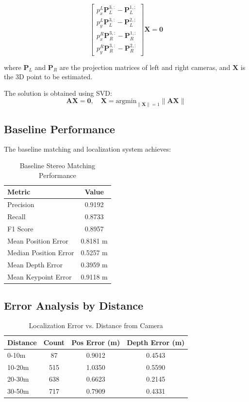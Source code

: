 \documentclass[11pt,a4paper]{article}
\begin{document}
\begin{equation}
\begin{bmatrix}
p_x^L \mathbf{P}_L^{3,:} - \mathbf{P}_L^{1,:} \\
p_y^L \mathbf{P}_L^{3,:} - \mathbf{P}_L^{2,:} \\
p_x^R \mathbf{P}_R^{3,:} - \mathbf{P}_R^{1,:} \\
p_y^R \mathbf{P}_R^{3,:} - \mathbf{P}_R^{2,:}
\end{bmatrix}
\mathbf{X} = \mathbf{0}
\end{equation}

where $\mathbf{P}_L$ and $\mathbf{P}_R$ are the projection matrices of left and right cameras, and $\mathbf{X}$ is the 3D point to be estimated.

The solution is obtained using SVD:
\begin{equation}
\mathbf{A}\mathbf{X} = \mathbf{0}, \quad \mathbf{X} = \text{argmin}_{\|\mathbf{X}\|=1} \|\mathbf{A}\mathbf{X}\|
\end{equation}

\subsection{Baseline Performance}

The baseline matching and localization system achieves:

\begin{table}[h]
\centering
\caption{Baseline Stereo Matching Performance}
\begin{tabular}{lc}
\toprule
\textbf{Metric} & \textbf{Value} \\
\midrule
Precision & 0.9192 \\
Recall & 0.8733 \\
F1 Score & 0.8957 \\
Mean Position Error & 0.8181 m \\
Median Position Error & 0.5257 m \\
Mean Depth Error & 0.3959 m \\
Mean Keypoint Error & 0.9118 m \\
\bottomrule
\end{tabular}
\end{table}

\subsection{Error Analysis by Distance}

\begin{table}[h]
\centering
\caption{Localization Error vs. Distance from Camera}
\begin{tabular}{lccc}
\toprule
\textbf{Distance} & \textbf{Count} & \textbf{Pos Error (m)} & \textbf{Depth Error (m)} \\
\midrule
0-10m & 87 & 0.9012 & 0.4543 \\
10-20m & 515 & 1.0350 & 0.5590 \\
20-30m & 638 & 0.6623 & 0.2145 \\
30-50m & 717 & 0.7909 & 0.4331 \\
\bottomrule
\end{tabular}
\end{table}
\end{document}

